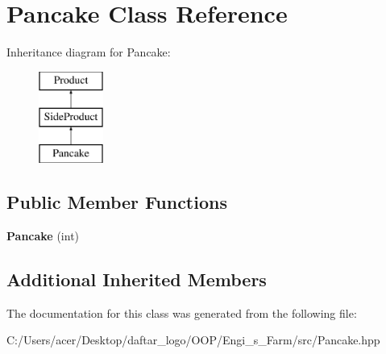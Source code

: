 \hypertarget{class_pancake}{}\section{Pancake Class Reference}
\label{class_pancake}
Inheritance diagram for Pancake\+:\begin{figure}[H]
\begin{center}
\leavevmode
\includegraphics[height=3.000000cm]{class_pancake}
\end{center}
\end{figure}
\subsection*{Public Member Functions}
\begin{DoxyCompactItemize}
\item 
\mbox{\label{class_pancake_a6152169c071413d35349ac63fd339499}} 
{\bfseries Pancake} (int)
\end{DoxyCompactItemize}
\subsection*{Additional Inherited Members}


The documentation for this class was generated from the following file\+:\begin{DoxyCompactItemize}
\item 
C\+:/\+Users/acer/\+Desktop/daftar\+\_\+logo/\+O\+O\+P/\+Engi\+\_\+s\+\_\+\+Farm/src/Pancake.\+hpp\end{DoxyCompactItemize}

